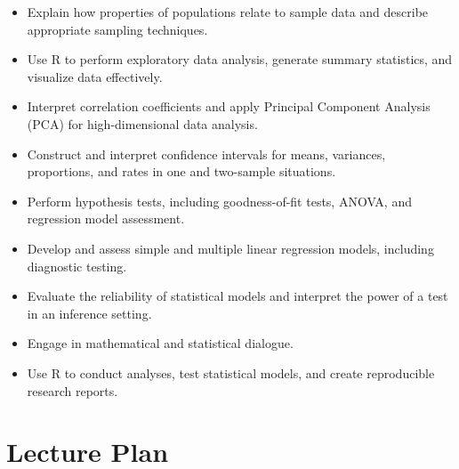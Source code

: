 \documentclass[
  a4paper,
  DIV=11,
  numbers=noendperiod,
  oneside]{scrreprt}
\providecommand{\tightlist}{%
  \setlength{\itemsep}{0pt}\setlength{\parskip}{0pt}}
\theoremstyle{definition}
\theoremstyle{definition}
\theoremstyle{plain}
\theoremstyle{plain}
\theoremstyle{definition}
\theoremstyle{remark}
\begin{document}
\begin{itemize}
\tightlist
\item
  Explain how properties of populations relate to sample data and
  describe appropriate sampling techniques.\\
\item
  Use R to perform exploratory data analysis, generate summary
  statistics, and visualize data effectively.\\
\item
  Interpret correlation coefficients and apply Principal Component
  Analysis (PCA) for high-dimensional data analysis.\\
\item
  Construct and interpret confidence intervals for means, variances,
  proportions, and rates in one and two-sample situations.\\
\item
  Perform hypothesis tests, including goodness-of-fit tests, ANOVA, and
  regression model assessment.\\
\item
  Develop and assess simple and multiple linear regression models,
  including diagnostic testing.\\
\item
  Evaluate the reliability of statistical models and interpret the power
  of a test in an inference setting.\\
\item
  Engage in mathematical and statistical dialogue.\\
\item
  Use R to conduct analyses, test statistical models, and create
  reproducible research reports.
\end{itemize}

\section*{Lecture Plan}\label{lecture-plan}

\end{document}

